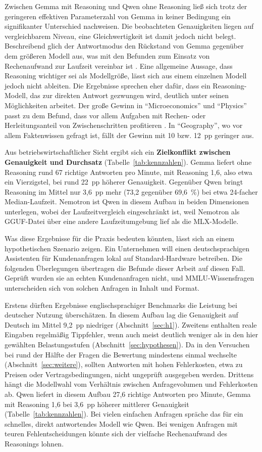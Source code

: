 \documentclass[a4paper,titlepage]{article}
\numberwithin{equation}{section} %
\begin{document}
Zwischen Gemma mit Reasoning und Qwen ohne Reasoning ließ sich trotz der geringeren effektiven Parameterzahl von Gemma in keiner Bedingung ein signifikanter Unterschied nachweisen. Die beobachteten Genauigkeiten liegen auf vergleichbarem Niveau, eine Gleichwertigkeit ist damit jedoch nicht belegt. Beschreibend glich der Antwortmodus den Rückstand von Gemma gegenüber dem größeren Modell aus, was mit den Befunden zum Einsatz von Rechenaufwand zur Laufzeit vereinbar ist \citep{snell_scaling_2024}. Eine allgemeine Aussage, dass Reasoning wichtiger sei als Modellgröße, lässt sich aus einem einzelnen Modell jedoch nicht ableiten. Die Ergebnisse sprechen eher dafür, dass ein Reasoning-Modell, das zur direkten Antwort gezwungen wird, deutlich unter seinen Möglichkeiten arbeitet. Der große Gewinn in "`Microeconomics"' und "`Physics"' passt zu dem Befund, dass vor allem Aufgaben mit Rechen- oder Herleitungsanteil von Zwischenschritten profitieren \citep{sprague_cot_2025}. In "`Geography"', wo vor allem Faktenwissen gefragt ist, fällt der Gewinn mit 10 bzw. 12~pp geringer aus.

Aus betriebswirtschaftlicher Sicht ergibt sich ein \textbf{Zielkonflikt zwischen Genauigkeit und Durchsatz} (Tabelle~\ref{tab:kennzahlen}). Gemma liefert ohne Reasoning rund 67 richtige Antworten pro Minute, mit Reasoning 1,6, also etwa ein Vierzigstel, bei rund 22~pp höherer Genauigkeit. Gegenüber Qwen bringt Reasoning im Mittel nur 3,6~pp mehr (73,2 gegenüber 69,6~\%) bei etwa 24-facher Median-Laufzeit. Nemotron ist Qwen in diesem Aufbau in beiden Dimensionen unterlegen, wobei der Laufzeitvergleich eingeschränkt ist, weil Nemotron als GGUF-Datei über eine andere Laufzeitumgebung lief als die MLX-Modelle.

Was diese Ergebnisse für die Praxis bedeuten könnten, lässt sich an einem hypothetischen Szenario zeigen. Ein Unternehmen will einen deutschsprachigen Assistenten für Kundenanfragen lokal auf Standard-Hardware betreiben. Die folgenden Überlegungen übertragen die Befunde dieser Arbeit auf diesen Fall. Geprüft wurden sie an echten Kundenanfragen nicht, und MMLU-Wissensfragen unterscheiden sich von solchen Anfragen in Inhalt und Format.

Erstens dürften Ergebnisse englischsprachiger Benchmarks die Leistung bei deutscher Nutzung überschätzen. In diesem Aufbau lag die Genauigkeit auf Deutsch im Mittel 9,2~pp niedriger (Abschnitt~\ref{sec:h1}). Zweitens enthalten reale Eingaben regelmäßig Tippfehler, wenn auch meist deutlich weniger als in den hier gewählten Belastungsstufen (Abschnitt~\ref{sec:hypothesen}). Da in den Versuchen bei rund der Hälfte der Fragen die Bewertung mindestens einmal wechselte (Abschnitt~\ref{sec:weitere}), sollten Antworten mit hohen Fehlerkosten, etwa zu Preisen oder Vertragsbedingungen, nicht ungeprüft ausgegeben werden. Drittens hängt die Modellwahl vom Verhältnis zwischen Anfragevolumen und Fehlerkosten ab. Qwen liefert in diesem Aufbau 27,6 richtige Antworten pro Minute, Gemma mit Reasoning 1,6 bei 3,6~pp höherer mittlerer Genauigkeit (Tabelle~\ref{tab:kennzahlen}). Bei vielen einfachen Anfragen spräche das für ein schnelles, direkt antwortendes Modell wie Qwen. Bei wenigen Anfragen mit teuren Fehlentscheidungen könnte sich der vielfache Rechenaufwand des Reasonings lohnen.
\end{document}
